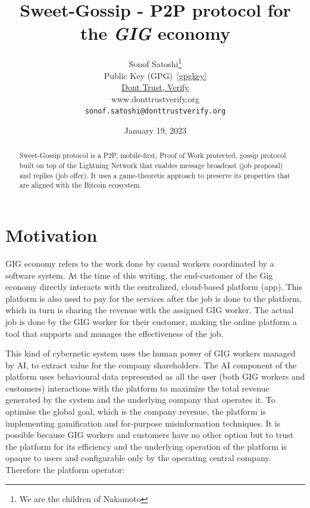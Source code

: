 \documentclass{article}
\title{Sweet-Gossip - P2P protocol for the \emph{GIG} economy}
\date{January 19, 2023}
\author{
	{Sonof Satoshi}\thanks{We are the children of Nakamoto} \\
	Public Key (GPG)~\ref{gpgkey} \\
	\href{www.donttrustverify.org}{Dont Trust, Verify}\\
	www.donttrustverify.org \\
	\texttt{sonof.satoshi@donttrustverify.org}\\
}
\begin{document}
\maketitle

\begin{abstract}
Sweet-Gossip protocol is a P2P, mobile-first, Proof of Work protected, gossip protocol built on top of the Lightning Network that enables message broadcast (job proposal) and replies (job offer). It uses a game-theoretic approach to preserve its properties that are aligned with the Bitcoin ecosystem.
\end{abstract}




\section{Motivation}

GIG economy refers to the work done by casual workers coordinated by a software system. At the time of this writing, the end-customer of the Gig economy directly interacts with the centralized, cloud-based platform (app). This platform is also used to pay for the services after the job is done to the platform, which in turn is sharing the revenue with the assigned GIG worker. The actual job is done by the GIG worker for their customer, making the online platform a tool that supports and manages the effectiveness of the job.

This kind of cybernetic system uses the human power of GIG workers managed by AI, to extract value for the company shareholders. The AI component of the platform uses behavioural data represented as all the user (both GIG workers and customers) interactions with the platform to maximize the total revenue generated by the system and the underlying company that operates it. To optimise the global goal, which is the company revenue, the platform is implementing gamification and for-purpose misinformation techniques. It is possible because GIG workers and customers have no other option but to trust the platform for its efficiency and the underlying operation of the platform is opaque to users and configurable only by the operating central company. Therefore the platform operator:
\end{document}
